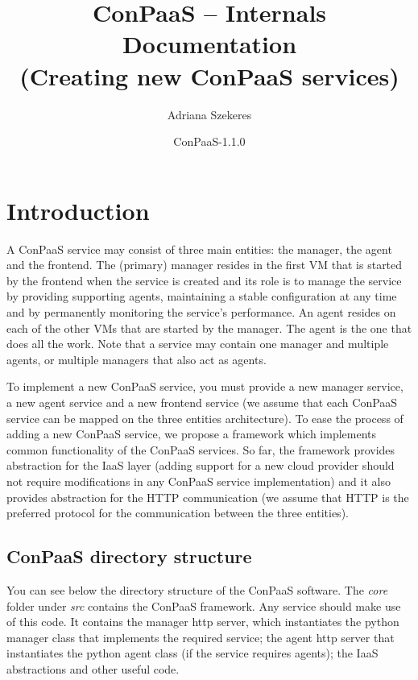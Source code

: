 \documentclass[10pt]{article}
\begin{document}
\title{ConPaaS -- Internals Documentation\\ \large (Creating new ConPaaS services)}
\author{Adriana Szekeres}
\date{ConPaaS-1.1.0}
\maketitle

\vfil
\tableofcontents
\newpage

\section{Introduction}

A ConPaaS service may consist of three main entities: the manager, the agent and the frontend. The (primary) manager resides in the first VM that is started by the frontend when the service is created and its role is to manage the service by providing supporting agents, maintaining a stable configuration at any time and by permanently monitoring the service's performance. An agent resides on each of the other VMs that are started by the manager. The agent is the one that does all the work. Note that a service may contain one manager and multiple agents, or multiple managers that also act as agents.

To implement a new ConPaaS service, you must provide a new manager service, a new agent service and a new frontend service (we assume that each ConPaaS service can be mapped on the three entities architecture). To ease the process of adding a new ConPaaS service, we propose a framework which implements common functionality of the ConPaaS services. So far, the framework provides abstraction for the IaaS layer (adding support for a new cloud provider should not require modifications in any ConPaaS service implementation) and it also provides abstraction for the HTTP communication (we assume that HTTP is the preferred protocol for the communication between the three entities).   

\subsection{ConPaaS directory structure}

You can see below the directory structure of the ConPaaS software. The \textit{core} folder under \textit{src} contains the ConPaaS framework. Any service should make use of this code. It contains the manager http server, which instantiates the python manager class that implements the required service; the agent http server that instantiates the python agent class (if the service requires agents); the IaaS abstractions and other useful code. 
\end{document}
